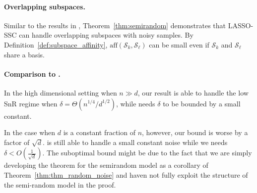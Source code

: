 \documentclass{ctexart}
\begin{document}
\paragraph{Overlapping subspaces.}
Similar to the results in \cite{soltanolkotabi2011geometric}, Theorem~\ref{thm:semirandom} demonstrates that LASSO-SSC can handle overlapping subspaces with noisy samples. By Definition~\ref{def:subspace_affinity}, $\mathrm{aff}(\mathcal{S}_k,\mathcal{S}_{\ell})$ can be small even if $\mathcal{S}_k$ and $\mathcal{S}_{\ell}$ share a basis.

\paragraph{Comparison to \cite{soltanolkotabi2013robust}.}
In the high dimensional setting when $n\gg d$, our result is able to handle the low SnR regime when $\delta = \Theta(n^{1/4}/d^{1/2})$, while \cite{soltanolkotabi2013robust} needs $\delta$ to be bounded by a small constant.

In the case when $d$ is a constant fraction of $n$, however, our bound is worse by a factor of $\sqrt{d}$. \cite{soltanolkotabi2013robust} is still able to handle a small constant noise while we needs $\delta < O(\frac{1}{\sqrt{d}})$. The suboptimal bound might be due to the fact that we are simply developing the theorem for the semirandom model as a corollary of Theorem~\ref{thm:thm_random_noise} and haven not fully exploit the structure of the semi-random model in the proof.

\end{document}
